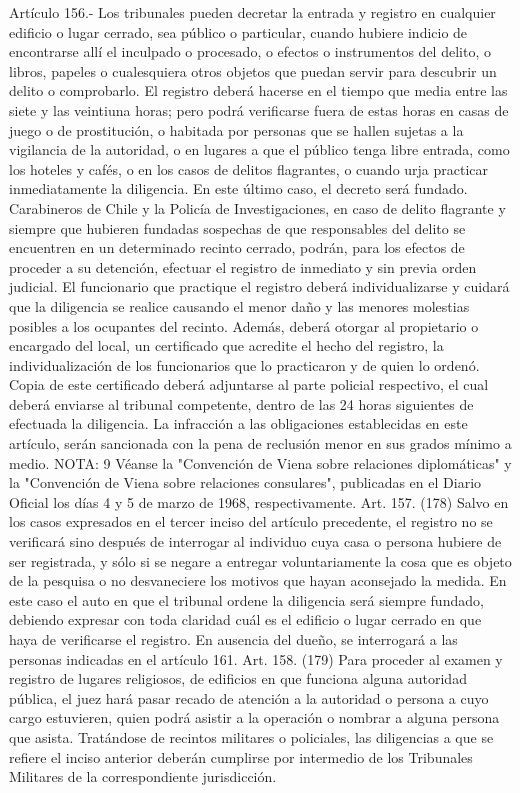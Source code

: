     Artículo 156.- Los tribunales pueden decretar la entrada y registro en cualquier edificio o lugar cerrado, sea público o particular, cuando hubiere indicio de encontrarse allí el inculpado o procesado, o efectos o instrumentos del delito, o libros, papeles o cualesquiera otros objetos que puedan servir para descubrir un delito o comprobarlo.
    El registro deberá hacerse en el tiempo que media entre las siete y las veintiuna horas; pero podrá verificarse fuera de estas horas en casas de juego o de prostitución, o habitada por personas que se hallen sujetas a la vigilancia de la autoridad, o en lugares a que el público tenga libre entrada, como los hoteles y cafés, o en los casos de delitos flagrantes, o cuando urja practicar inmediatamente la diligencia. En este último caso, el decreto será fundado.
    Carabineros de Chile y la Policía de Investigaciones, en caso de delito flagrante y siempre que hubieren fundadas sospechas de que responsables del delito se encuentren en un determinado recinto cerrado, podrán, para los efectos de proceder a su detención, efectuar el registro de inmediato y sin previa orden judicial. El funcionario que practique el registro deberá individualizarse y cuidará que la diligencia se realice causando el menor daño y las menores molestias posibles a los ocupantes del recinto.
    Además, deberá otorgar al propietario o encargado del local, un certificado que acredite el hecho del registro, la individualización de los funcionarios que lo practicaron y de quien lo ordenó. Copia de este certificado deberá adjuntarse al parte policial respectivo, el cual deberá enviarse al tribunal competente, dentro de las 24 horas siguientes de efectuada la diligencia.
    La infracción a las obligaciones establecidas en este artículo, serán sancionada con la pena de reclusión menor en sus grados mínimo a medio.
NOTA:  9
    Véanse la "Convención de Viena sobre relaciones diplomáticas" y la "Convención de Viena sobre relaciones consulares", publicadas en el Diario Oficial los días 4 y 5 de marzo de 1968, respectivamente.
    Art. 157. (178) Salvo en los casos expresados en el tercer inciso del artículo precedente, el registro no se verificará sino después de interrogar al individuo cuya casa o persona hubiere de ser registrada, y sólo si se negare a entregar voluntariamente la cosa que es objeto de la pesquisa o no desvaneciere los motivos que hayan aconsejado la medida.
    En este caso el auto en que el tribunal ordene la diligencia será siempre fundado, debiendo expresar con toda claridad cuál es el edificio o lugar cerrado en que haya de verificarse el registro.
    En ausencia del dueño, se interrogará a las personas indicadas en el artículo 161.
    Art. 158. (179) Para proceder al examen y registro de lugares religiosos, de edificios en que funciona alguna autoridad pública, el juez hará pasar recado de atención a la autoridad o persona a cuyo cargo estuvieren, quien podrá asistir a la operación o nombrar a alguna persona que asista.
    Tratándose de recintos militares o policiales, las diligencias a que se refiere el inciso anterior deberán cumplirse por intermedio de los Tribunales Militares de la correspondiente jurisdicción.

